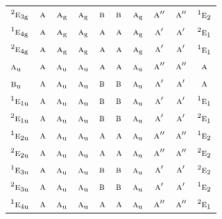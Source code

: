 \documentclass[10pt,a4paper]{article}
\numberwithin{equation}{section}
\newcommand{\irr}[1]{\text{\normalfont\scshape #1}}
\newcommand{\conjpair}[1]{{}^{#1}}
\newcommand{\ptag}[1]{\mathrm{#1}}
\begin{document}
{\begin{longtable}{@{}lccccccccc@{}}
$\conjpair{2}\irr{e}_{3\ptag{g}}$ & $\irr{a}$ & $\irr{a}_{\ptag{g}}$ & $\irr{a}_{\ptag{g}}$ & $\irr{b}$ & $\irr{b}$ & $\irr{a}_{\ptag{g}}$ & $\irr{a}''$ & $\irr{a}''$ & $\conjpair{1}\irr{e}_{2}$\\
$\conjpair{1}\irr{e}_{4\ptag{g}}$ & $\irr{a}$ & $\irr{a}_{\ptag{g}}$ & $\irr{a}_{\ptag{g}}$ & $\irr{a}$ & $\irr{a}$ & $\irr{a}_{\ptag{g}}$ & $\irr{a}'$ & $\irr{a}'$ & $\conjpair{2}\irr{e}_{1}$\\
$\conjpair{2}\irr{e}_{4\ptag{g}}$ & $\irr{a}$ & $\irr{a}_{\ptag{g}}$ & $\irr{a}_{\ptag{g}}$ & $\irr{a}$ & $\irr{a}$ & $\irr{a}_{\ptag{g}}$ & $\irr{a}'$ & $\irr{a}'$ & $\conjpair{1}\irr{e}_{1}$\\
$\irr{a}_{\ptag{u}}$ & $\irr{a}$ & $\irr{a}_{\ptag{u}}$ & $\irr{a}_{\ptag{u}}$ & $\irr{a}$ & $\irr{a}$ & $\irr{a}_{\ptag{u}}$ & $\irr{a}''$ & $\irr{a}''$ & $\irr{a}$\\
$\irr{b}_{\ptag{u}}$ & $\irr{a}$ & $\irr{a}_{\ptag{u}}$ & $\irr{a}_{\ptag{u}}$ & $\irr{b}$ & $\irr{b}$ & $\irr{a}_{\ptag{u}}$ & $\irr{a}'$ & $\irr{a}'$ & $\irr{a}$\\
$\conjpair{1}\irr{e}_{1\ptag{u}}$ & $\irr{a}$ & $\irr{a}_{\ptag{u}}$ & $\irr{a}_{\ptag{u}}$ & $\irr{b}$ & $\irr{b}$ & $\irr{a}_{\ptag{u}}$ & $\irr{a}'$ & $\irr{a}'$ & $\conjpair{1}\irr{e}_{1}$\\
$\conjpair{2}\irr{e}_{1\ptag{u}}$ & $\irr{a}$ & $\irr{a}_{\ptag{u}}$ & $\irr{a}_{\ptag{u}}$ & $\irr{b}$ & $\irr{b}$ & $\irr{a}_{\ptag{u}}$ & $\irr{a}'$ & $\irr{a}'$ & $\conjpair{2}\irr{e}_{1}$\\
$\conjpair{1}\irr{e}_{2\ptag{u}}$ & $\irr{a}$ & $\irr{a}_{\ptag{u}}$ & $\irr{a}_{\ptag{u}}$ & $\irr{a}$ & $\irr{a}$ & $\irr{a}_{\ptag{u}}$ & $\irr{a}''$ & $\irr{a}''$ & $\conjpair{1}\irr{e}_{2}$\\
$\conjpair{2}\irr{e}_{2\ptag{u}}$ & $\irr{a}$ & $\irr{a}_{\ptag{u}}$ & $\irr{a}_{\ptag{u}}$ & $\irr{a}$ & $\irr{a}$ & $\irr{a}_{\ptag{u}}$ & $\irr{a}''$ & $\irr{a}''$ & $\conjpair{2}\irr{e}_{2}$\\
$\conjpair{1}\irr{e}_{3\ptag{u}}$ & $\irr{a}$ & $\irr{a}_{\ptag{u}}$ & $\irr{a}_{\ptag{u}}$ & $\irr{b}$ & $\irr{b}$ & $\irr{a}_{\ptag{u}}$ & $\irr{a}'$ & $\irr{a}'$ & $\conjpair{2}\irr{e}_{2}$\\
$\conjpair{2}\irr{e}_{3\ptag{u}}$ & $\irr{a}$ & $\irr{a}_{\ptag{u}}$ & $\irr{a}_{\ptag{u}}$ & $\irr{b}$ & $\irr{b}$ & $\irr{a}_{\ptag{u}}$ & $\irr{a}'$ & $\irr{a}'$ & $\conjpair{1}\irr{e}_{2}$\\
$\conjpair{1}\irr{e}_{4\ptag{u}}$ & $\irr{a}$ & $\irr{a}_{\ptag{u}}$ & $\irr{a}_{\ptag{u}}$ & $\irr{a}$ & $\irr{a}$ & $\irr{a}_{\ptag{u}}$ & $\irr{a}''$ & $\irr{a}''$ & $\conjpair{2}\irr{e}_{1}$\\

\end{longtable}}
\end{document}

